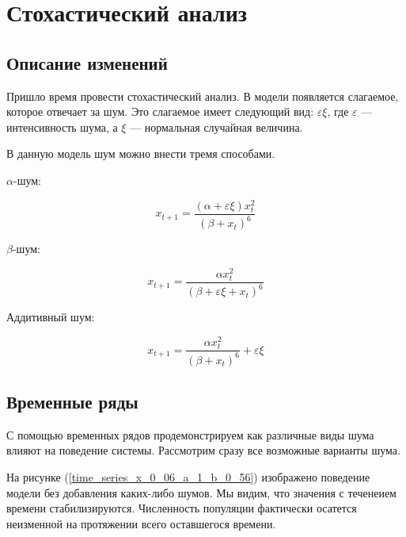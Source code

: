 \section{Стохастический анализ}

    \subsection{Описание изменений}

        Пришло время провести стохастический анализ. В модели появляется слагаемое, которое отвечает за шум. Это слагаемое имеет следующий вид: \(\varepsilon \xi\), где \(\varepsilon\) --- интенсивность шума, а \(\xi\) --- нормальная случайная величина.


        В данную модель шум можно внести тремя способами.

        \(\alpha\)-шум: 

        \begin{equation}
            \label{alpha_chaos}
            x_{t + 1} = \frac{(\alpha + \varepsilon \xi) x_t^2}{(\beta + x_t)^6}
        \end{equation}

        \(\beta\)-шум:

        \begin{equation}
            \label{beta_chaos}
            x_{t + 1} = \frac{\alpha x_t^2}{(\beta + \varepsilon \xi + x_t)^6}
        \end{equation}

        Аддитивный шум:

        \begin{equation}
            \label{additive_chaos}
            x_{t + 1} = \frac{\alpha x_t^2}{(\beta + x_t)^6} + \varepsilon \xi
        \end{equation}

    \subsection{Временные ряды}

        С помощью временных рядов продемонстрируем как различные виды шума влияют на поведение системы. Рассмотрим сразу все возможные варианты шума. 

        На рисунке (\ref{time_series_x_0_06_a_1_b_0_56}) изображено поведение модели без добавления каких-либо шумов. Мы видим, что значения с теченеием времени стабилизируются. Численность популяции фактически осатется неизменной на протяжении всего оставшегося времени.

